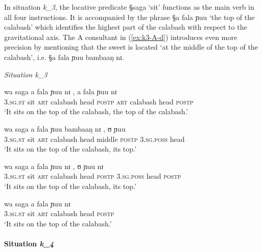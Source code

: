 In situation {\it k_{3}}, the locative predicate {\S saga} `sit' functions as 
the main verb in all four instructions. It is accompanied by the phrase {\S a
fala ɲuu} `the top of the calabash' which identifies the highest part of
the
calabash with respect to the gravitational axis. The A consultant in
(\ref{ex:k3-A-d}) introduces even more precision by mentioning that the  sweet
is
located  `at the middle of the top of the calabash', i.e. {\S a fala ɲuu bambaaŋ
nɪ}.

\begin{exe}
\ex\label{ex:k3}\textit{Situation {\it k_{3}}}\\
 \begin{xlist}
  \ex\label{ex:k3-A-w}
\gll  wa saga a fala ɲuu nɪ , a fala ɲuu nɪ\\
\textsc{3.sg.st} sit \textsc{art} calabash head \textsc{postp} {}  \textsc{art}
calabash head \textsc{postp}\\

\glt `It sits on the top of the calabash, the top of the calabash.'

\ex\label{ex:k3-A-d}
\gll  wa saga a fala ɲuu bambaaŋ nɪ , ʊ ɲuu\\
\textsc{3.sg.st} sit \textsc{art} calabash head middle \textsc{postp} {}
\textsc{3.sg.poss} head\\

\glt `It sits on the top of the calabash, its top.'


\ex\label{ex:k3-B-t}
\gll  wa saga a fala ɲuu nɪ , ʊ ɲuu nɪ\\
\textsc{3.sg.st} sit \textsc{art} calabash head \textsc{postp} {}
\textsc{3.sg.poss} head \textsc{postp}\\

\glt `It sits on the top of the calabash, its top.'


\ex\label{ex:k3-B-m}
\gll  wa saga a fala ɲuu nɪ\\
\textsc{3.sg.st} sit \textsc{art} calabash head  \textsc{postp}\\

\glt `It sits on the top of the calabash.'

\end{xlist}

\end{exe}




\paragraph{Situation {\it k_{4}}}
\label{sec:SPA-exper1-loca}

